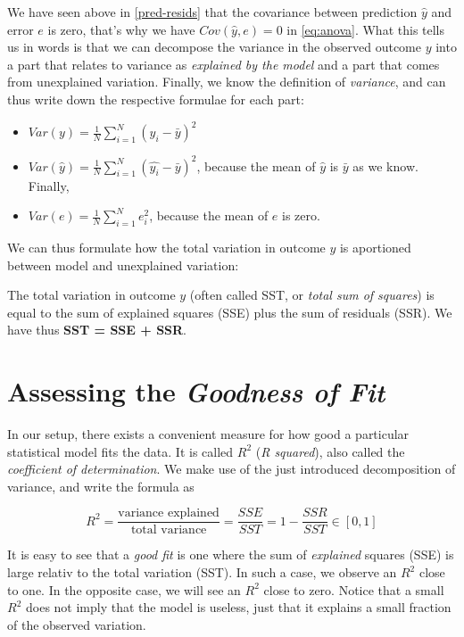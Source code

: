 \documentclass[]{book}
\providecommand{\tightlist}{%
  \setlength{\itemsep}{0pt}\setlength{\parskip}{0pt}}
\newenvironment{tip}{\begin{tcolorbox}[colback=green!5!white,colframe=green]}{\end{tcolorbox}}
\begin{document}
We have seen above in \ref{pred-resids} that the covariance between
prediction \(\hat{y}\) and error \(e\) is zero, that's why we have
\(Cov(\hat{y},e)=0\) in \eqref{eq:anova}. What this tells us in words is
that we can decompose the variance in the observed outcome \(y\) into a
part that relates to variance as \emph{explained by the model} and a
part that comes from unexplained variation. Finally, we know the
definition of \emph{variance}, and can thus write down the respective
formulae for each part:

\begin{itemize}
\tightlist
\item
  \(Var(y) = \frac{1}{N}\sum_{i=1}^N (y_i - \bar{y})^2\)
\item
  \(Var(\hat{y}) = \frac{1}{N}\sum_{i=1}^N (\hat{y_i} - \bar{y})^2\),
  because the mean of \(\hat{y}\) is \(\bar{y}\) as we know. Finally,
\item
  \(Var(e) = \frac{1}{N}\sum_{i=1}^N e_i^2\), because the mean of \(e\)
  is zero.
\end{itemize}

We can thus formulate how the total variation in outcome \(y\) is
aportioned between model and unexplained variation:

\begin{tip}
The total variation in outcome \(y\) (often called SST, or \emph{total
sum of squares}) is equal to the sum of explained squares (SSE) plus the
sum of residuals (SSR). We have thus \textbf{SST = SSE + SSR}.
\end{tip}

\section{\texorpdfstring{Assessing the \emph{Goodness of
Fit}}{Assessing the Goodness of Fit}}\label{assessing-the-goodness-of-fit}

In our setup, there exists a convenient measure for how good a
particular statistical model fits the data. It is called \(R^2\)
(\emph{R squared}), also called the \emph{coefficient of determination}.
We make use of the just introduced decomposition of variance, and write
the formula as

\begin{equation}
R^2 = \frac{\text{variance explained}}{\text{total variance}} = \frac{SSE}{SST} = 1 - \frac{SSR}{SST}\in[0,1]  \label{eq:Rsquared}
\end{equation}

It is easy to see that a \emph{good fit} is one where the sum of
\emph{explained} squares (SSE) is large relativ to the total variation
(SST). In such a case, we observe an \(R^2\) close to one. In the
opposite case, we will see an \(R^2\) close to zero. Notice that a small
\(R^2\) does not imply that the model is useless, just that it explains
a small fraction of the observed variation.
\end{document}
